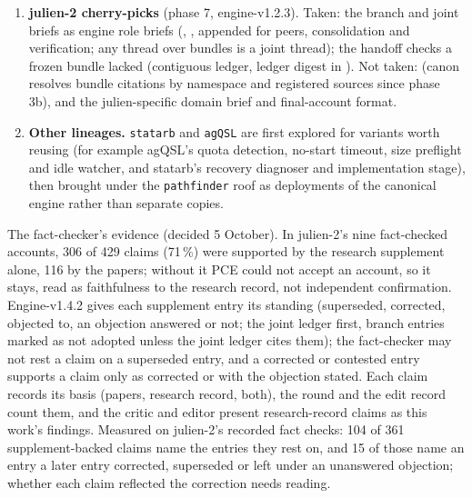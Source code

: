 \documentclass[11pt,a4paper]{article}
\begin{document}
\begin{enumerate}
  turns an eva2 experiment (three direct-EVA branch campaigns and a joint campaign) into one
  canonical composable pair: the joint thread with eva2's exact branch bundles under canonical
  inventories, the branch threads kept as , the settings as branch and joint
  overrides, the dollar settings dropped. Checked on eva-top-ten-01-q002-p024 (joint DRAFT,
  bundles verified); the imported pair goes on to edit and paper in the engine. Its 38 calls,
  read from eva2's runtime store, took 56\,M input tokens for one pair (18 peer calls at 3\,M
  each), about ten times a single-thread statarb pair: the cost of three branches and a joint
  thread, which D10's measurements should be weighed against.
\item \textbf{julien-2 cherry-picks} (phase 7, engine-v1.2.3). Taken: the
  branch and joint briefs as engine role briefs (,
  , appended for peers, consolidation and verification;
  any thread over bundles is a joint thread); the handoff checks a frozen bundle
  lacked (contiguous ledger, ledger digest in ). Not taken:
   (canon resolves bundle citations by
  namespace and registered sources since phase 3b), and the julien-specific
  domain brief and final-account format.
\item \textbf{Other lineages.} \texttt{statarb} and \texttt{agQSL} are first
  explored for variants worth reusing (for example agQSL's quota detection,
  no-start timeout, size preflight and idle watcher, and statarb's recovery
  diagnoser and implementation stage), then brought under the \texttt{pathfinder}
  roof as deployments of the canonical engine rather than separate copies.
\end{enumerate}

The fact-checker's evidence (decided 5 October). In julien-2's nine fact-checked accounts, 306 of 429 claims (71\,\%) were supported by the research supplement alone, 116 by the papers; without it PCE could not accept an account, so it stays, read as faithfulness to the research record, not independent confirmation. Engine-v1.4.2 gives each supplement entry its standing (superseded, corrected, objected to, an objection answered or not; the joint ledger first, branch entries marked as not adopted unless the joint ledger cites them); the fact-checker may not rest a claim on a superseded entry, and a corrected or contested entry supports a claim only as corrected or with the objection stated. Each claim records its basis (papers, research record, both), the round and the edit record count them, and the critic and editor present research-record claims as this work's findings. Measured on julien-2's recorded fact checks: 104 of 361 supplement-backed claims name the entries they rest on, and 15 of those name an entry a later entry corrected, superseded or left under an unanswered objection; whether each claim reflected the correction needs reading.
\end{document}
